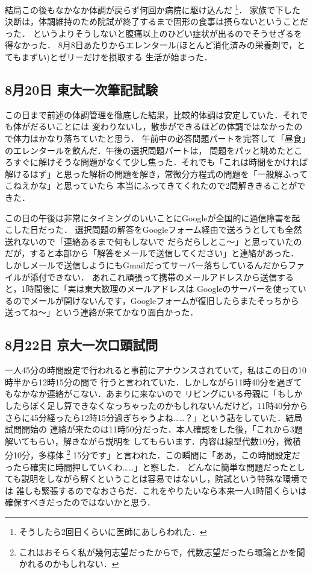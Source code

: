\documentclass[dvipdfmx,uplatex]{jsarticle}
\begin{document}
結局この後もなかなか体調が戻らず何回か病院に駆け込んだ
\footnote{そうしたら2回目くらいに医師にあしらわれた．}．
家族で下した決断は，体調維持のため院試が終了するまで固形の食事は摂らないということだった．
というよりそうしないと腹痛以上のひどい症状が出るのでそうせざるを得なかった．
8月8日あたりからエレンタール(ほとんど消化済みの栄養剤で，とてもまずい)とゼリーだけを摂取する
生活が始まった．

\subsection{8月20日 東大一次筆記試験}
この日まで前述の体調管理を徹底した結果，比較的体調は安定していた．それでも体がだるいことには
変わりないし，散歩ができるほどの体調ではなかったので体力はかなり落ちていたと思う．
午前中の必答問題パートを完答して「昼食」のエレンタールを飲んだ．午後の選択問題パートは，
問題をパッと眺めたところすぐに解けそうな問題がなくて少し焦った．それでも「これは時間をかければ
解けるはず」と思った解析の問題を解き，常微分方程式の問題を「一般解ふってこねえかな」と思っていたら
本当にふってきてくれたので2問解ききることができた．

この日の午後は非常にタイミングのいいことにGoogleが全国的に通信障害を起こした日だった．
選択問題の解答をGoogleフォーム経由で送ろうとしても全然送れないので「連絡あるまで何もしないで
だらだらしとこ～」と思っていたのだが，すると本部から「解答をメールで送信してください」と連絡があった．
しかしメールで送信しようにもGmailだってサーバー落ちしているんだからファイルが添付できない．
あれこれ頑張って携帯のメールアドレスから送信すると，1時間後に「実は東大数理のメールアドレスは
Googleのサーバーを使っているのでメールが開けないんです，Googleフォームが復旧したらまたそっちから
送ってね～」という連絡が来てかなり面白かった．

\subsection{8月22日 京大一次口頭試問}
一人45分の時間設定で行われると事前にアナウンスされていて，私はこの日の10時半から12時15分の間で
行うと言われていた．しかしながら11時40分を過ぎてもなかなか連絡がこない．あまりに来ないので
リビングにいる母親に「もしかしたらぼく足し算できなくなっちゃったのかもしれないんだけど，11時40分から
さらに45分経ったら12時15分過ぎちゃうよね……？」という話をしていた．結局試問開始の
連絡が来たのは11時50分だった．本人確認をした後，「これから3題解いてもらい，解きながら説明を
してもらいます．内容は線型代数10分，微積分10分，多様体
\footnote{これはおそらく私が幾何志望だったからで，代数志望だったら環論とかを聞かれるのかもしれない．}
15分です」と言われた．この瞬間に「ああ，この時間設定だったら確実に時間押していくわ……」と察した．
どんなに簡単な問題だったとしても説明をしながら解くということは容易ではないし，院試という特殊な環境では
誰しも緊張するのでなおさらだ．これをやりたいなら本来一人1時間くらいは確保すべきだったのではないかと思う．
\end{document}
